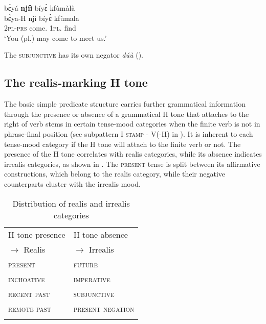 \ea\label{SBJVd}
  \glll  bɛ̀yá {\bfseries njíì} bíyɛ̀ kfùmàlà \\
         bɛ̀ya-H njì bíyɛ̀ kfùmala\\
         2\textsc{pl}-\textsc{prs}  come.{\SBJV} 1\textsc{pl}.{\OBJ} find\\
    \trans `You (pl.) may come to meet us.'
\z

The \textsc{subjunctive} has its own negator  {\itshape dúù} ().









\subsection{The realis-marking H tone}
\label{sec:SynH}

The basic simple predicate structure carries further grammatical information through the presence or absence of a grammatical H tone that attaches to the right of verb stems in certain tense-mood categories when the finite verb is not in phrase-final position (see subpattern I \textsc{stamp} - V(-H) in ). It is inherent to each tense-mood category if the H tone will attach to the finite verb or not. The presence of the H tone correlates with realis categories, while its absence indicates irrealis categories, as shown in . The \textsc{present} tense is split between its affirmative constructions, which belong to the realis category, while their negative counterparts cluster with the irrealis mood. 


\begin{table}
\begin{tabularx}{.8\textwidth}{Xl}
\lsptoprule
H tone presence & H tone absence\\
$\rightarrow$ Realis & $\rightarrow$ Irrealis\\
 \midrule
\textsc{present} & \textsc{future} \\
\textsc{inchoative} & \textsc{imperative}  \\
\textsc{recent past}  & \textsc{subjunctive} \\
\textsc{remote past} &  \textsc{present negation}\\
\lspbottomrule
\end{tabularx}
\caption{Distribution of realis and irrealis categories}
\label{Tab:RIRRaxis}
\end{table}

